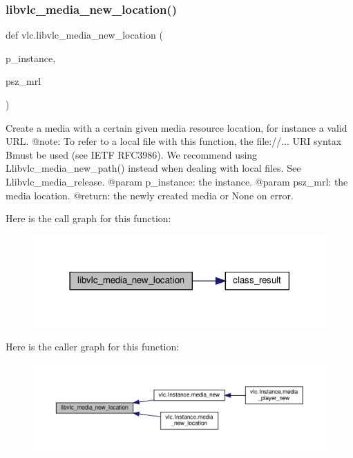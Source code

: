 \mbox{\label{namespacevlc_a19cace5a9aa822730b23b7b38f46de31}} 
\subsubsection{\texorpdfstring{libvlc\+\_\+media\+\_\+new\+\_\+location()}{libvlc\_media\_new\_location()}}
{\footnotesize\ttfamily def vlc.\+libvlc\+\_\+media\+\_\+new\+\_\+location (\begin{DoxyParamCaption}\item[{}]{p\+\_\+instance,  }\item[{}]{psz\+\_\+mrl }\end{DoxyParamCaption})}

\begin{DoxyVerb}Create a media with a certain given media resource location,
for instance a valid URL.
@note: To refer to a local file with this function,
the file://... URI syntax B{must} be used (see IETF RFC3986).
We recommend using L{libvlc_media_new_path}() instead when dealing with
local files.
See L{libvlc_media_release}.
@param p_instance: the instance.
@param psz_mrl: the media location.
@return: the newly created media or None on error.
\end{DoxyVerb}
 Here is the call graph for this function\+:
\nopagebreak
\begin{figure}[H]
\begin{center}
\leavevmode
\includegraphics[width=318pt]{namespacevlc_a19cace5a9aa822730b23b7b38f46de31_cgraph}
\end{center}
\end{figure}
Here is the caller graph for this function\+:
\nopagebreak
\begin{figure}[H]
\begin{center}
\leavevmode
\includegraphics[width=350pt]{namespacevlc_a19cace5a9aa822730b23b7b38f46de31_icgraph}
\end{center}
\end{figure}
\mbox{\label{namespacevlc_af8a94ee24b767ca229760d6630f20475}} 

